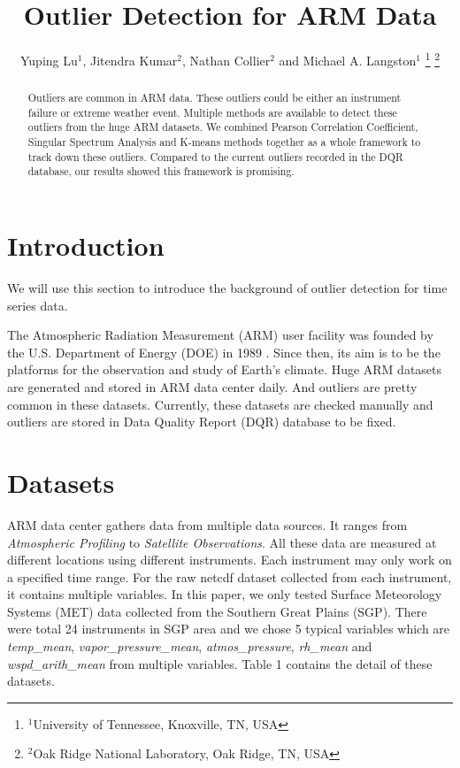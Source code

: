 \documentclass[letterpaper, 10 pt, conference]{ieeeconf}  %
\title{\LARGE \bf
Outlier Detection for ARM Data
}
\author{Yuping Lu$^{1}$, Jitendra Kumar$^{2}$, Nathan Collier$^{2}$ and Michael A. Langston$^{1}$%
\thanks{$^{1}$University of Tennessee, Knoxville, TN, USA}%
\thanks{$^{2}$Oak Ridge National Laboratory, Oak Ridge, TN, USA}%
}
\begin{document}
\maketitle
\thispagestyle{empty}
\pagestyle{empty}

\begin{abstract}

Outliers are common in ARM data. These outliers could be either an instrument failure or extreme weather event. Multiple methods are available to detect these outliers from the huge ARM datasets. We combined Pearson Correlation Coefficient, Singular Spectrum Analysis and K-means methods together as a whole framework to track down these outliers. Compared to the current outliers recorded in the DQR database, our results showed this framework is promising.

\end{abstract}


\section{Introduction}
We will use this section to introduce the background of outlier detection for time series data. \cite{gupta2014outlier} 

The Atmospheric Radiation Measurement (ARM) user facility was founded by the U.S. Department of Energy (DOE) in 1989 \cite{ARM}. Since then, its aim is to be the platforms for the observation and study of Earth's climate. Huge ARM datasets are generated and stored in ARM data center daily. And outliers are pretty common in these datasets. Currently, these datasets are checked manually and outliers are stored in Data Quality Report (DQR) database to be fixed.

\section{Datasets}
ARM data center gathers data from multiple data sources. It ranges from \textit{Atmospheric Profiling} to \textit{Satellite Observations}. All these data are measured at different locations using different instruments. Each instrument may only work on a specified time range. For the raw netcdf dataset collected from each instrument, it contains multiple variables. In this paper, we only tested Surface Meteorology Systems (MET) data collected from the Southern Great Plains (SGP). There were total 24 instruments in SGP area and we chose 5 typical variables which are \textit{temp\_mean}, \textit{vapor\_pressure\_mean}, \textit{atmos\_pressure}, \textit{rh\_mean} and \textit{wspd\_arith\_mean} from multiple variables. Table 1 contains the detail of these datasets.
\end{document}
